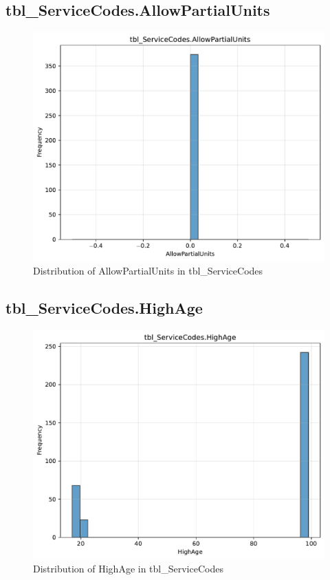 \subsection{tbl\_ServiceCodes.AllowPartialUnits}

\begin{figure}[htbp]
\centering
\includegraphics[width=\textwidth]{figures/dbo_tbl_ServiceCodes_AllowPartialUnits.pdf}
\caption{Distribution of AllowPartialUnits in tbl\_ServiceCodes}
\end{figure}\newpage

\subsection{tbl\_ServiceCodes.HighAge}

\begin{figure}[htbp]
\centering
\includegraphics[width=\textwidth]{figures/dbo_tbl_ServiceCodes_HighAge.pdf}
\caption{Distribution of HighAge in tbl\_ServiceCodes}
\end{figure}\newpage

